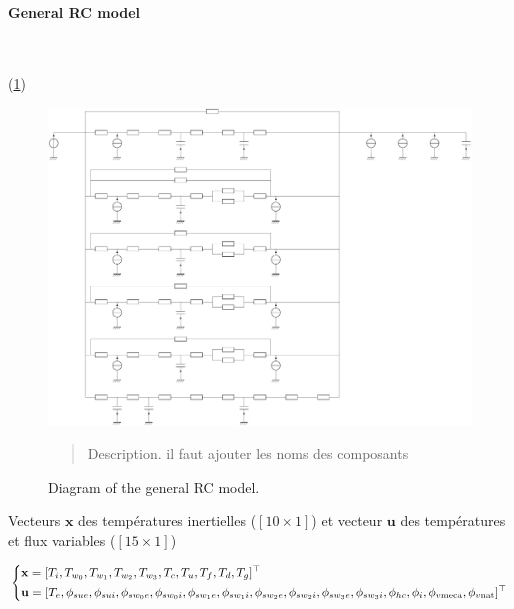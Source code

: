 \documentclass[11pt]{article}
\begin{document}
        

        \paragraph{General RC model}\mbox{}\\ %
        \label{par:general_rc_model}
        
        (\ref{fig:rc_mod})

        \begin{figure}[ht]
            \centering
            \includegraphics[width=0.99\columnwidth]{figures/RC_genmod_unlabeled.pdf}
            \caption{\label{fig:rc_mod} Diagram of the general RC model.}
            \begin{quote}
                \vspace{-2mm}
                \small\noindent
                Description. il faut ajouter les noms des composants 
              \end{quote}
        \end{figure}  


        Vecteurs $\mathbf{x}$ des températures inertielles ($[10\times 1]$) et vecteur $\mathbf{u}$ des températures et flux variables ($[15\times 1]$)

        \begin{equation}
          \begin{dcases}
            \mathbf{x} = [T_i, T_{w_0}, T_{w_1}, T_{w_2}, T_{w_3}, T_c, T_u, T_f, T_d, T_g]^\top \\
            \mathbf{u} = [T_e, \phi_{sue}, \phi_{sui}, \phi_{sw_0e}, \phi_{sw_0i}, \phi_{sw_1e}, \phi_{sw_1i}, \phi_{sw_2e}, \phi_{sw_2i}, \phi_{sw_3e}, \phi_{sw_3i}, \phi_{hc}, \phi_{i}, \phi_{v\mathrm{meca}}, \phi_{v\mathrm{nat}}]^\top
          \end{dcases}
        \end{equation}
\end{document}
